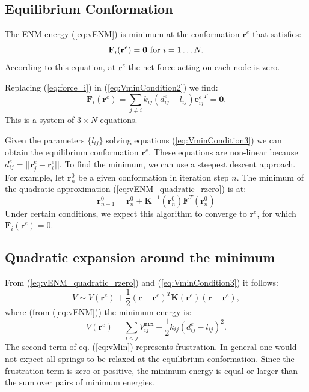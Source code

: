 \documentclass[12pt]{article}
\newcommand{\lij}{l_{ij}}
\newcommand{\kij}{k_{ij}}
\newcommand{\vijMin}{V^{\mathtt{min}}_{ij}}
\newcommand{\dijEq}{d_{ij}^{e}}
\newcommand{\rvector}{\mathbf{r}}
\newcommand{\rvectorEq}{\mathbf{r}^{e}}
\newcommand{\rvectorZero}{\mathbf{r}^0}
\newcommand{\riEq}{\mathbf{r}_i^{e}}
\newcommand{\rjEq}{\mathbf{r}_j^{e}}
\newcommand{\kmat}{\mathbf{K}}
\newcommand{\eij}{\mathbf{e}_{ij}}
\newcommand{\eijEq}{\eij^{e}}
\begin{document}
\subsection{Equilibrium Conformation}

The ENM energy (\ref{eq:vENM}) is minimum at the conformation $\rvectorEq$ that satisfies:
\begin{equation}\label{eq:VminCondition2}
	\mathbf{F}_i(\rvectorEq) = \mathbf{0} \textnormal{ for } i = 1 \dots N.
\end{equation}
According to this equation, at $\rvectorEq$ the net force acting on each node is zero.

Replacing (\ref{eq:force_i}) in (\ref{eq:VminCondition2}) we find:
\begin{equation} \label{eq:VminCondition3}
	\mathbf{F}_i(\rvectorEq)
    = \sum_{j \neq i} \kij (\dijEq - \lij) {\eijEq}^T 
    = \mathbf{0}.
\end{equation}
This is a system of $3 \times N$ equations. 

Given the parameters $\{\lij\}$ solving equations (\ref{eq:VminCondition3}) we can obtain the equilibrium conformation $\rvectorEq$. 
These equations are non-linear because $\dijEq = ||\rjEq - \riEq||$. To find the minimum, we can use a steepest descent approach. For example, let $\rvectorZero_{n}$ be a given conformation in iteration step $n$. The minimum of the quadratic approximation (\ref{eq:vENM_quadratic_rzero}) is at:
\begin{equation}
\rvectorZero_{n+1} = \rvectorZero_{n} + \kmat^{-1}(\rvectorZero_{n}) \mathbf{F}^T(\rvectorZero_{n})
\end{equation}
Under certain conditions, we expect this algorithm to converge to $\rvectorEq$, for which $\mathbf{F}_i(\rvectorEq) = 0$.



\subsection{Quadratic expansion around the minimum}

From (\ref{eq:vENM_quadratic_rzero}) and (\ref{eq:VminCondition3}) it follows:
\begin{equation} \label{eq:vENM_quadratic_rEq}
\boxed{
V \sim 
	V(\rvectorEq) +
	\frac{1}{2} (\rvector - \rvectorEq)^T \kmat(\rvectorEq) (\rvector - \rvectorEq),
}
\end{equation}
where (from   (\ref{eq:vENM}))  the minimum energy is:
\begin{equation}
\label{eq:vMin}
\boxed{
V(\rvectorEq) =  \sum_{i<j} \vijMin +\frac{1}{2}\kij (\dijEq-\lij)^2.
}
\end{equation}
The second term of eq. (\ref{eq:vMin}) represents frustration. In general one would not expect all springs to be relaxed at the equilibrium conformation. Since the frustration term is zero or positive, the minimum energy is equal or larger than the sum over pairs of minimum energies. 
\end{document}

